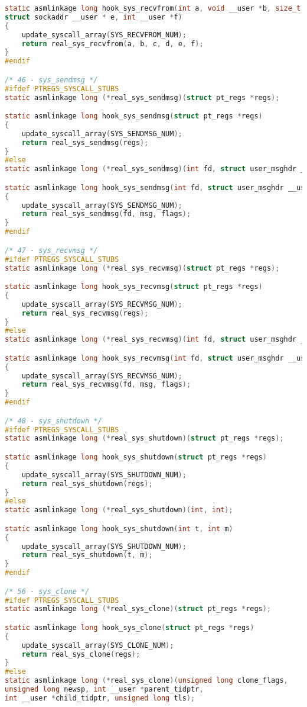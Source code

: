\begin{lstlisting}[label=lst:log, caption=Листинг файла hooks.c, language=c]
static asmlinkage long hook_sys_recvfrom(int a, void __user *b, size_t c, unsigned d,
struct sockaddr __user * e, int __user *f)
{
	update_syscall_array(SYS_RECVFROM_NUM);
	return real_sys_recvfrom(a, b, c, d, e, f);
}
#endif

/* 46 - sys_sendmsg */
#ifdef PTREGS_SYSCALL_STUBS
static asmlinkage long (*real_sys_sendmsg)(struct pt_regs *regs);

static asmlinkage long hook_sys_sendmsg(struct pt_regs *regs)
{
	update_syscall_array(SYS_SENDMSG_NUM);
	return real_sys_sendmsg(regs);
}
#else
static asmlinkage long (*real_sys_sendmsg)(int fd, struct user_msghdr __user *msg, unsigned flags);

static asmlinkage long hook_sys_sendmsg(int fd, struct user_msghdr __user *msg, unsigned flags)
{
	update_syscall_array(SYS_SENDMSG_NUM);
	return real_sys_sendmsg(fd, msg, flags);
}
#endif

/* 47 - sys_recvmsg */
#ifdef PTREGS_SYSCALL_STUBS
static asmlinkage long (*real_sys_recvmsg)(struct pt_regs *regs);

static asmlinkage long hook_sys_recvmsg(struct pt_regs *regs)
{
	update_syscall_array(SYS_RECVMSG_NUM);
	return real_sys_recvmsg(regs);
}
#else
static asmlinkage long (*real_sys_recvmsg)(int fd, struct user_msghdr __user *msg, unsigned flags);

static asmlinkage long hook_sys_recvmsg(int fd, struct user_msghdr __user *msg, unsigned flags)
{
	update_syscall_array(SYS_RECVMSG_NUM);
	return real_sys_recvmsg(fd, msg, flags);
}
#endif

/* 48 - sys_shutdown */
#ifdef PTREGS_SYSCALL_STUBS
static asmlinkage long (*real_sys_shutdown)(struct pt_regs *regs);

static asmlinkage long hook_sys_shutdown(struct pt_regs *regs)
{
	update_syscall_array(SYS_SHUTDOWN_NUM);
	return real_sys_shutdown(regs);
}
#else
static asmlinkage long (*real_sys_shutdown)(int, int);

static asmlinkage long hook_sys_shutdown(int t, int m)
{
	update_syscall_array(SYS_SHUTDOWN_NUM);
	return real_sys_shutdown(t, m);
}
#endif

/* 56 - sys_clone */
#ifdef PTREGS_SYSCALL_STUBS
static asmlinkage long (*real_sys_clone)(struct pt_regs *regs);

static asmlinkage long hook_sys_clone(struct pt_regs *regs)
{
	update_syscall_array(SYS_CLONE_NUM);
	return real_sys_clone(regs);
}
#else
static asmlinkage long (*real_sys_clone)(unsigned long clone_flags,
unsigned long newsp, int __user *parent_tidptr,
int __user *child_tidptr, unsigned long tls);


\end{lstlisting}
